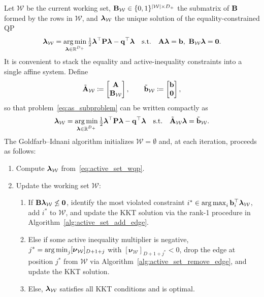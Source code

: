 Let $\mathcal{W}$ be the current working set, $\mathbf{B}_\mathcal{W}\in\{0,1\}^{|\mathcal{W}|\times D_+}$ the submatrix of $\mathbf{B}$ formed by the rows in $\mathcal{W}$, and $\boldsymbol{\lambda}_\mathcal{W}$ the unique solution of the equality-constrained QP
\begin{equation}\label{eq:as_subproblem}
	\lh_\mathcal{W} = \argmin_{\lh\in\R^{D_+}}\tfrac{1}{2}\lh^\top\P\lh - \q^\top\lh \quad\text{s.t.}\quad \A\lh=\b,\ \B_\mathcal{W}\lh=\mathbf{0}.
\end{equation}
It is convenient to stack the equality and active-inequality constraints into a single affine system. Define
\begin{equation}
	\tilde{\mathbf{A}}_\mathcal{W}\coloneqq\begin{bmatrix}\mathbf{A}\\\mathbf{B}_\mathcal{W}\end{bmatrix},
	\qquad
	\tilde{\mathbf{b}}_\mathcal{W}\coloneqq\begin{bmatrix}\mathbf{b}\\\mathbf{0}\end{bmatrix},
\end{equation}
so that problem~\eqref{eq:as_subproblem} can be written compactly as
\begin{equation}\label{eq:active_set_wqp}
	\boldsymbol{\lambda}_\mathcal{W}=\operatorname*{arg\,min}_{\boldsymbol{\lambda}\in\mathbb{R}^{D_+}}\tfrac{1}{2}\boldsymbol{\lambda}^\top\mathbf{P}\boldsymbol{\lambda}-\mathbf{q}^\top\boldsymbol{\lambda}
	\quad\text{s.t.}\quad\tilde{\mathbf{A}}_\mathcal{W}\boldsymbol{\lambda}=\tilde{\mathbf{b}}_\mathcal{W}.
\end{equation}
The Goldfarb--Idnani algorithm initializes $\mathcal{W}=\emptyset$ and, at each iteration, proceeds as follows:
\begin{enumerate}
	\item Compute $\boldsymbol{\lambda}_\mathcal{W}$ from~\eqref{eq:active_set_wqp}.
	\item Update the working set $\mathcal{W}$:
	\begin{enumerate}	
		\item If $\mathbf{B}\boldsymbol{\lambda}_\mathcal{W}\not\leq\mathbf{0}$, identify the most violated constraint $i^\ast\in\operatorname*{arg\,max}_i\mathbf{b}_i^\top\boldsymbol{\lambda}_\mathcal{W}$, add $i^\ast$ to $\mathcal{W}$, and update the KKT solution via the rank-1 procedure in Algorithm~\ref{alg:active_set_add_edge}.
		\item Else if some active inequality multiplier is negative, $j^\ast=\operatorname*{arg\,min}_j[\boldsymbol{\nu}_\mathcal{W}]_{D+1+j}$ with $[\boldsymbol{\nu}_\mathcal{W}]_{D+1+j^\ast}<0$, drop the edge at position $j^\ast$ from $\mathcal{W}$ via Algorithm~\ref{alg:active_set_remove_edge}, and update the KKT solution.
		\item Else, $\boldsymbol{\lambda}_\mathcal{W}$ satisfies all KKT conditions and is optimal.
	\end{enumerate}
\end{enumerate}


